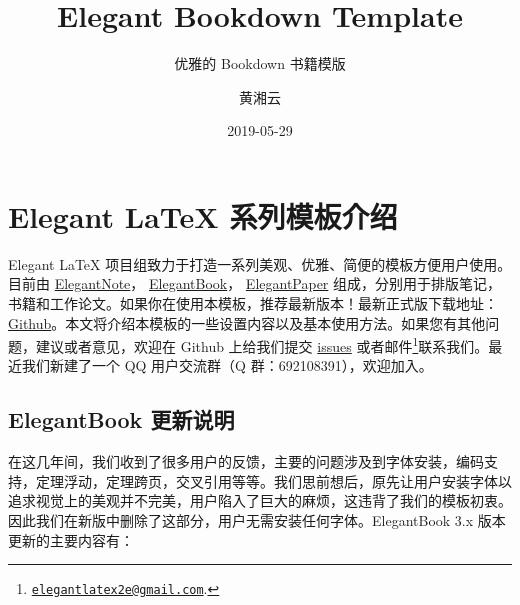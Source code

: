 \documentclass[cn,11pt,fancy,hide]{elegantbook}
\title{Elegant Bookdown Template}
\subtitle{优雅的 Bookdown 书籍模版}
\author{黄湘云}
\date{2019-05-29}
\institute{Elegant LaTeX Program}
\let\rmarkdownfootnote\footnote%
\def\footnote{\protect\rmarkdownfootnote}
\begin{document}
\maketitle

{
\setcounter{tocdepth}{2}
\tableofcontents
}
\mainmatter

\hypersetup{pageanchor=true}

\hypertarget{elegant-latex-}{%
\chapter{Elegant LaTeX 系列模板介绍}\label{elegant-latex-}}

Elegant LaTeX 项目组致力于打造一系列美观、优雅、简便的模板方便用户使用。目前由 \href{https://github.com/ElegantLaTeX/ElegantNote}{ElegantNote}， \href{https://github.com/ElegantLaTeX/ElegantBook}{ElegantBook}， \href{https://github.com/ElegantLaTeX/ElegantPaper}{ElegantPaper} 组成，分别用于排版笔记，书籍和工作论文。如果你在使用本模板，推荐最新版本！最新正式版下载地址： \href{https://github.com/ElegantLaTeX/ElegantBook/releases}{Github}。本文将介绍本模板的一些设置内容以及基本使用方法。如果您有其他问题，建议或者意见，欢迎在 Github 上给我们提交 \href{https://github.com/ElegantLaTeX/ElegantBook/issues}{issues} 或者邮件\footnote{\href{mailto:elegantlatex2e@gmail.com}{\nolinkurl{elegantlatex2e@gmail.com}}.}联系我们。最近我们新建了一个 QQ 用户交流群（Q 群：692108391），欢迎加入。

\hypertarget{elegantbook-}{%
\section{ElegantBook 更新说明}\label{elegantbook-}}

在这几年间，我们收到了很多用户的反馈，主要的问题涉及到字体安装，编码支持，定理浮动，定理跨页，交叉引用等等。我们思前想后，原先让用户安装字体以追求视觉上的美观并不完美，用户陷入了巨大的麻烦，这违背了我们的模板初衷。因此我们在新版中删除了这部分，用户无需安装任何字体。ElegantBook 3.x 版本更新的主要内容有：
\end{document}
